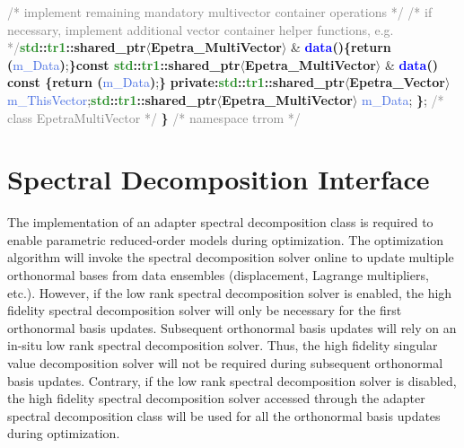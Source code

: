     \tab\textcolor{gray}{/* implement remaining mandatory multivector container operations */}\newline\newline
    \tab\textcolor{gray}{/* if necessary, implement additional vector container helper functions, e.g. */}\newline\tab\textbf{\textcolor{ForestGreen}{std}::\textcolor{ForestGreen}{tr1}::\textcolor{Melon}{shared\_ptr}$\langle$\textcolor{Melon}{Epetra\_MultiVector}$\rangle$} \& \textbf{\textcolor{blue}{data}()\{return (}\textcolor{RoyalBlue}{m\_Data}\textbf{)};\textbf{\}}\newline\tab\textbf{const \textcolor{ForestGreen}{std}::\textcolor{ForestGreen}{tr1}::\textcolor{Melon}{shared\_ptr}$\langle$\textcolor{Melon}{Epetra\_MultiVector}$\rangle$} \& \textbf{\textcolor{blue}{data}() const \{return (}\textcolor{RoyalBlue}{m\_Data}\textbf{)};\textbf{\}}\newline\newline
    \textbf{private:}\newline\tab\textbf{\textcolor{ForestGreen}{std}::\textcolor{ForestGreen}{tr1}::\textcolor{Melon}{shared\_ptr}$\langle$\textcolor{Melon}{Epetra\_Vector}$\rangle$} \textcolor{RoyalBlue}{m\_ThisVector};\newline\tab\textbf{\textcolor{ForestGreen}{std}::\textcolor{ForestGreen}{tr1}::\textcolor{Melon}{shared\_ptr}$\langle$\textcolor{Melon}{Epetra\_MultiVector}$\rangle$} \textcolor{RoyalBlue}{m\_Data};\newline
    \textbf{\}}; \textcolor{gray}{/* class EpetraMultiVector */} \newline
    \textbf{\}} \textcolor{gray}{/* namespace trrom */}
    
    \section{Spectral Decomposition Interface}\label{sec:SpectralDecom}
    
    The implementation of an adapter spectral decomposition class is required to enable parametric reduced-order models during optimization. The optimization algorithm will invoke the spectral decomposition solver online to update multiple orthonormal bases from data ensembles (displacement, Lagrange multipliers, etc.). However, if the low rank spectral decomposition solver is enabled, the high fidelity spectral decomposition solver will only be necessary for the first orthonormal basis updates. Subsequent orthonormal basis updates will rely on an in-situ low rank spectral decomposition solver. Thus, the high fidelity singular value decomposition solver will not be required during subsequent orthonormal basis updates. Contrary, if the low rank spectral decomposition solver is disabled, the high fidelity spectral decomposition solver accessed through the adapter spectral decomposition class will be used for all the orthonormal basis updates during optimization.
    
